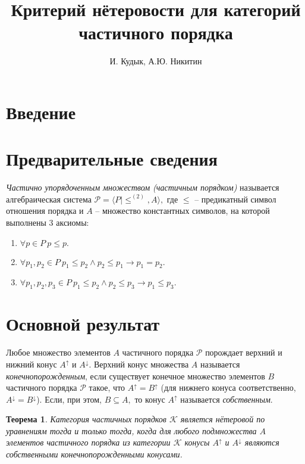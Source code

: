 \documentclass[12pt]{article}
\title{Критерий нётеровости для категорий частичного порядка}
\author{И. Кудык, А.Ю. Никитин}
\theoremstyle{break}
\newtheorem{Th}{Теорема}
\def\P{\mathcal{P}}
\begin{document}
    \maketitle %
    \thispagestyle{empty} %
    \tableofcontents %
    \newpage
    
    \section{Введение} %

	\section{Предварительные сведения}
		\textit{Частично упорядоченным множеством (частичным порядком)} называется алгебраическая система $\P = \langle P | \leqslant^{(2)}, A\rangle,$ где $\leqslant$ -- предикатный символ отношения порядка и $A$ -- множество константных символов, на которой выполнены 3 аксиомы:
		\begin{enumerate}
			\item $\forall p\in P\ p\leqslant p.$
			\item $\forall p_1, p_2\in P\ p_1 \leqslant p_2 \wedge p_2 \leqslant p_1 \rightarrow p_1=p_2.$
			\item $\forall p_1, p_2, p_3\in P\ p_1 \leqslant p_2 \wedge p_2 \leqslant p_3 \rightarrow p_1 \leqslant p_3.$
		\end{enumerate}
	
	\section{Основной результат}
		Любое множество элементов $A$ частичного порядка $\P$ порождает верхний и нижний конус $A^{\uparrow}$ и $A^{\downarrow}$. Верхний конус множества $A$ называется \textit{конечнопорожденным}, если существует конечное множество элементов $B$ частичного порядка $\P$ такое, что $A^{\uparrow} = B^{\uparrow}$ (для нижнего конуса соответственно, $A^{\downarrow} = B^{\downarrow}$). Если, при этом, $B\subseteq A,$ то конус $A^{\uparrow}$ называется \textit{собственным}.

		\begin{Th}
			Категория частичных порядков $\mathcal{K}$ является нётеровой по уравнениям тогда и только тогда, когда для любого подмножества $A$ элементов частичного порядка из категории $\mathcal{K}$ конусы $A^{\uparrow}$ и $A^{\downarrow}$ являются собственными конечнопорожденными конусами.
		\end{Th}
\end{document}
